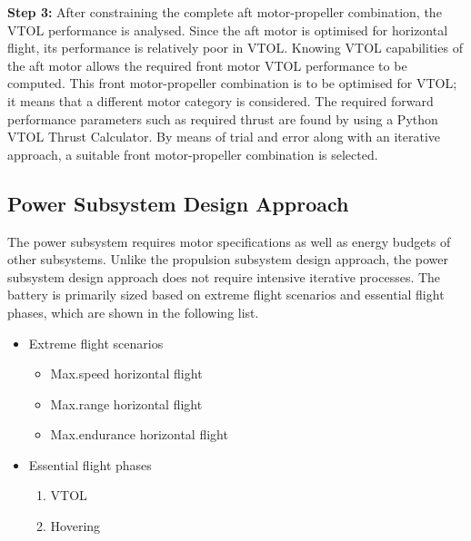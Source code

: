 
\noindent \textbf{Step 3:} After constraining the complete aft motor-propeller combination, the VTOL performance is analysed. Since the aft motor is optimised for horizontal flight, its performance is relatively poor in VTOL. Knowing VTOL capabilities of the aft motor allows the required front motor VTOL performance to be computed. This front motor-propeller combination is to be optimised for VTOL; it means that a different motor category is considered. The required forward performance parameters such as required thrust are found by using a Python VTOL Thrust Calculator. By means of trial and error along with an iterative approach, a suitable front motor-propeller combination is selected.

\subsection{Power Subsystem Design Approach}
The power subsystem requires motor specifications as well as energy budgets of other subsystems. Unlike the propulsion subsystem design approach, the power subsystem design approach does not require intensive iterative processes. The battery is primarily sized based on extreme flight scenarios and essential flight phases, which are shown in the following list.

\begin{itemize}
    \item Extreme flight scenarios
    \begin{itemize}
        \item Max.speed horizontal flight
        \item Max.range horizontal flight
        \item Max.endurance horizontal flight    
    \end{itemize}
    \item Essential flight phases
    \begin{enumerate}
        \item VTOL
        \item Hovering
    \end{enumerate}
\end{itemize}

